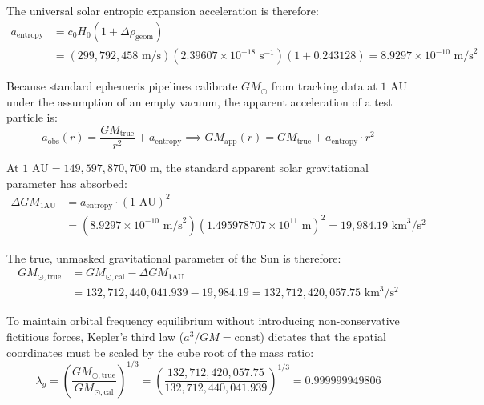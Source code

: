 \documentclass[11pt,a4paper]{article}
\begin{document}
The universal solar entropic expansion acceleration is therefore:
\begin{align}
a_{\text{entropy}} &= c_0 H_0 (1 + \Delta\rho_{\text{geom}}) \nonumber\\
&= (299{,}792{,}458\text{ m/s})(2.39607 \times 10^{-18}\text{ s}^{-1})(1 + 0.243128) = 8.9297 \times 10^{-10}\text{ m/s}^2
\label{eq:a_entropy_val}
\end{align}

Because standard ephemeris pipelines calibrate $GM_\odot$ from tracking data at $1\text{ AU}$ under the assumption of an empty vacuum, the apparent acceleration of a test particle is:
\begin{equation}
a_{\text{obs}}(r) = \frac{GM_{\text{true}}}{r^2} + a_{\text{entropy}} \implies GM_{\text{app}}(r) = GM_{\text{true}} + a_{\text{entropy}} \cdot r^2
\label{eq:gm_app_eq}
\end{equation}

At $1\text{ AU} = 149{,}597{,}870{,}700\text{ m}$, the standard apparent solar gravitational parameter has absorbed:
\begin{equation}
\begin{aligned}
\Delta GM_{1\text{AU}} &= a_{\text{entropy}} \cdot (1\text{ AU})^2 \\
&= (8.9297 \times 10^{-10}\text{ m/s}^2)(1.495978707 \times 10^{11}\text{ m})^2 = 19{,}984.19\text{ km}^3/\text{s}^2
\end{aligned}
\label{eq:delta_gm_1au}
\end{equation}

The true, unmasked gravitational parameter of the Sun is therefore:
\begin{equation}
\begin{aligned}
GM_{\odot,\text{true}} &= GM_{\odot,\text{cal}} - \Delta GM_{1\text{AU}} \\
&= 132{,}712{,}440{,}041.939 - 19{,}984.19 = 132{,}712{,}420{,}057.75\text{ km}^3/\text{s}^2
\end{aligned}
\label{eq:gm_true_sun}
\end{equation}

To maintain orbital frequency equilibrium without introducing non-conservative fictitious forces, Kepler's third law ($a^3 / GM = \text{const}$) dictates that the spatial coordinates must be scaled by the cube root of the mass ratio:
\begin{equation}
\lambda_g = \left( \frac{GM_{\odot,\text{true}}}{GM_{\odot,\text{cal}}} \right)^{1/3} = \left( \frac{132{,}712{,}420{,}057.75}{132{,}712{,}440{,}041.939} \right)^{1/3} = \mathbf{0.999999949806}
\label{eq:lambda_g_val}
\end{equation}
\end{document}
